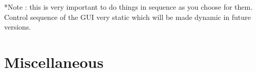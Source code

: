 \documentclass[12pt]{article}
\begin{document}
*Note : this is very important to do things in sequence as you choose for them. Control sequence of the GUI very static which will be made dynamic in future versions. 


  



\section{Miscellaneous}
\end{document}

